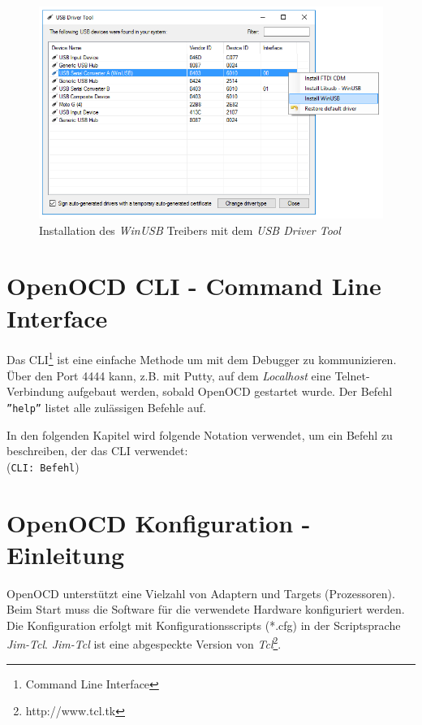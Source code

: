 \begin{figure}[htbp]
	\centering
		\includegraphics[width=12cm,keepaspectratio]{images/InstallWinUSBDriver.png}
	\caption{Installation des \textit{WinUSB} Treibers mit dem \textit{USB Driver Tool}}
	\label{fig:InstallWinUSBDriver}
\end{figure}


\section{OpenOCD CLI - Command Line Interface}
Das CLI\footnote{Command Line Interface} ist eine einfache Methode um mit dem Debugger zu kommunizieren.
Über den Port 4444 kann, z.B. mit Putty, auf dem \textit{Localhost} eine Telnet-Verbindung aufgebaut werden, sobald OpenOCD gestartet wurde.
Der Befehl \texttt{''help''} listet alle zulässigen Befehle auf.

In den folgenden Kapitel wird folgende Notation verwendet, um ein Befehl zu beschreiben, der das CLI verwendet:\\
(\texttt{CLI: Befehl})


\section{OpenOCD Konfiguration - Einleitung}
OpenOCD unterstützt eine Vielzahl von Adaptern und Targets (Prozessoren).
Beim Start muss die Software für die verwendete Hardware konfiguriert werden.
Die Konfiguration erfolgt mit Konfigurationsscripts (*.cfg) in der Scriptsprache \textit{Jim-Tcl}.
\textit{Jim-Tcl} ist eine abgespeckte Version von \textit{Tcl}\footnote{http://www.tcl.tk}.

